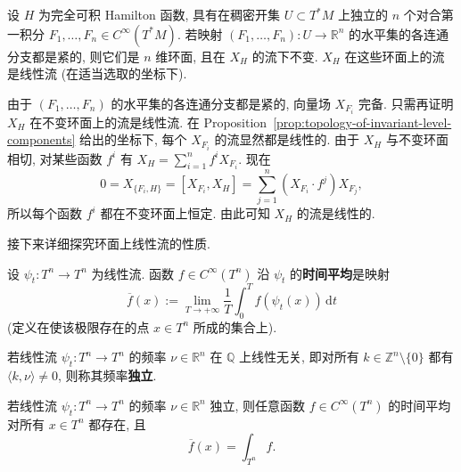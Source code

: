\begin{RiemannTheorem}\label{thm:arnold-liouville-for-integrable-hamiltonian-systems}
设 $H$ 为完全可积 Hamilton 函数, 具有在稠密开集 $U\subset T^*M$ 上独立的 $n$ 个对合第一积分 $F_1,\ldots,F_n\in C^\infty(T^*M)$. 若映射 $(F_1,\ldots,F_n):U\to\mathbb{R}^n$ 的水平集的各连通分支都是紧的, 则它们是 $n$ 维环面, 且在 $X_H$ 的流下不变. $X_H$ 在这些环面上的流是线性流 (在适当选取的坐标下).
\end{RiemannTheorem}

\begin{RiemannProof}
由于 $(F_1,\ldots,F_n)$ 的水平集的各连通分支都是紧的, 向量场 $X_{F_i}$ 完备. 只需再证明 $X_H$ 在不变环面上的流是线性流. 在 Proposition~\ref{prop:topology-of-invariant-level-components} 给出的坐标下, 每个 $X_{F_i}$ 的流显然都是线性的. 由于 $X_H$ 与不变环面相切, 对某些函数 $f^i$ 有 $X_H=\sum_{i=1}^n f^iX_{F_i}$. 现在
\[
  0=X_{\{F_i,H\}}=[X_{F_i},X_H]=\sum_{j=1}^n(X_{F_i}\cdot f^j)X_{F_j},
\]
所以每个函数 $f^i$ 都在不变环面上恒定. 由此可知 $X_H$ 的流是线性的.
\end{RiemannProof}

接下来详细探究环面上线性流的性质.

\begin{RiemannDefinition}\label{def:time-average-along-linear-torus-flow}
设 $\psi_t:T^n\to T^n$ 为线性流. 函数 $f\in C^\infty(T^n)$ 沿 $\psi_t$ 的\textbf{时间平均}是映射
\[
  \overline f(x):=\lim_{T\to+\infty}\frac{1}{T}\int_0^T f(\psi_t(x))\,\mathrm{d}t
\]
(定义在使该极限存在的点 $x\in T^n$ 所成的集合上).
\end{RiemannDefinition}

\begin{RiemannDefinition}\label{def:independent-frequencies-for-linear-flow}
若线性流 $\psi_t:T^n\to T^n$ 的频率 $\nu\in\mathbb{R}^n$ 在 $\mathbb{Q}$ 上线性无关, 即对所有 $k\in\mathbb{Z}^n\setminus\{0\}$ 都有 $\langle k,\nu\rangle\ne0$, 则称其频率\textbf{独立}.
\end{RiemannDefinition}

\begin{RiemannTheorem}\label{thm:birkhoff-ergodicity-for-linear-torus-flow}
若线性流 $\psi_t:T^n\to T^n$ 的频率 $\nu\in\mathbb{R}^n$ 独立, 则任意函数 $f\in C^\infty(T^n)$ 的时间平均对所有 $x\in T^n$ 都存在, 且
\[
  \overline f(x)=\int_{T^n}f.
\]
\end{RiemannTheorem}

